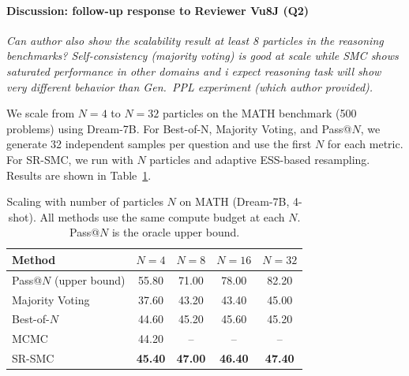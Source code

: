 \documentclass{article}
\newcommand{\review}[1]{{\color{darkblue} \textit{#1}}}
\begin{document}
\paragraph{Discussion: follow-up response to Reviewer Vu8J (Q2)}

\review{Can author also show the scalability result at least 8 particles in the reasoning benchmarks? Self-consistency (majority voting) is good at scale while SMC shows saturated performance in other domains and i expect reasoning task will show very different behavior than Gen.\ PPL experiment (which author provided).}

\vspace{0.5em}

We scale from $N=4$ to $N=32$ particles on the MATH benchmark (500 problems) using Dream-7B. For Best-of-N, Majority Voting, and Pass@$N$, we generate 32 independent samples per question and use the first $N$ for each metric. For SR-SMC, we run with $N$ particles and adaptive ESS-based resampling. Results are shown in Table~\ref{tab:scaling}.

\begin{table}[ht]
  \caption{Scaling with number of particles $N$ on MATH (Dream-7B, 4-shot). All methods use the same compute budget at each $N$. Pass@$N$ is the oracle upper bound.}
  \label{tab:scaling}
  \centering
    \begin{tabular}{l cccc}
      \toprule
      Method & $N=4$ & $N=8$ & $N=16$ & $N=32$ \\
      \midrule
      Pass@$N$ (upper bound) & 55.80 & 71.00 & 78.00 & 82.20 \\
      \midrule
      Majority Voting   & 37.60 & 43.20 & 43.40 & 45.00 \\
      Best-of-$N$       & 44.60 & 45.20 & 45.60 & 45.20 \\
      MCMC              & 44.20 & -- & -- & -- \\
      SR-SMC            & \textbf{45.40} & \textbf{47.00} & \textbf{46.40} & \textbf{47.40} \\
      \bottomrule
    \end{tabular}
\end{table}
\end{document}

